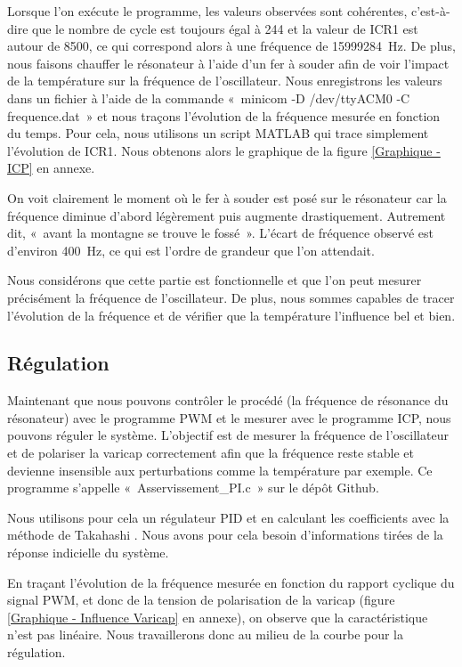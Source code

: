 \documentclass[12pt, a4paper, titlepage]{article}
\begin{document}
Lorsque l'on exécute le programme, les valeurs observées sont cohérentes, c'est-à-dire que le nombre de cycle est toujours égal à 244 et la valeur de ICR1 est autour de 8500, ce qui correspond alors à une fréquence de \SI{15999284}{\hertz}. De plus, nous faisons chauffer le résonateur à l'aide d'un fer à souder afin de voir l'impact de la température sur la fréquence de l'oscillateur. Nous enregistrons les valeurs dans un fichier à l'aide de la commande «~minicom -D /dev/ttyACM0 -C frequence.dat~» et nous traçons l'évolution de la fréquence mesurée en fonction du temps. Pour cela, nous utilisons un script MATLAB qui trace simplement l'évolution de ICR1. Nous obtenons alors le graphique de la figure \ref{Graphique - ICP} en annexe.

On voit clairement le moment où le fer à souder est posé sur le résonateur car la fréquence diminue d'abord légèrement puis augmente drastiquement. Autrement dit, «~avant la montagne se trouve le fossé~». L'écart de fréquence observé est d'environ \SI{400}{\hertz}, ce qui est l'ordre de grandeur que l'on attendait.

Nous considérons que cette partie est fonctionnelle et que l'on peut mesurer précisément la fréquence de l'oscillateur. De plus, nous sommes capables de tracer l'évolution de la fréquence et de vérifier que la température l'influence bel et bien.

\subsection{Régulation}

Maintenant que nous pouvons contrôler le procédé (la fréquence de résonance du résonateur) avec le programme PWM et le mesurer avec le programme ICP, nous pouvons réguler le système. L'objectif est de mesurer la fréquence de l'oscillateur et de polariser la varicap correctement afin que la fréquence reste stable et devienne insensible aux perturbations comme la température par exemple. Ce programme s'appelle «~Asservissement\_PI.c~» sur le dépôt Github.

Nous utilisons pour cela un régulateur PID et en calculant les coefficients avec la méthode de Takahashi \cite{Cours automatique Gonzalo}. Nous avons pour cela besoin d'informations tirées de la réponse indicielle du système.

En traçant l'évolution de la fréquence mesurée en fonction du rapport cyclique du signal PWM, et donc de la tension de polarisation de la varicap (figure \ref{Graphique - Influence Varicap} en annexe), on observe que la caractéristique n'est pas linéaire. Nous travaillerons donc au milieu de la courbe pour la régulation.
\end{document}
